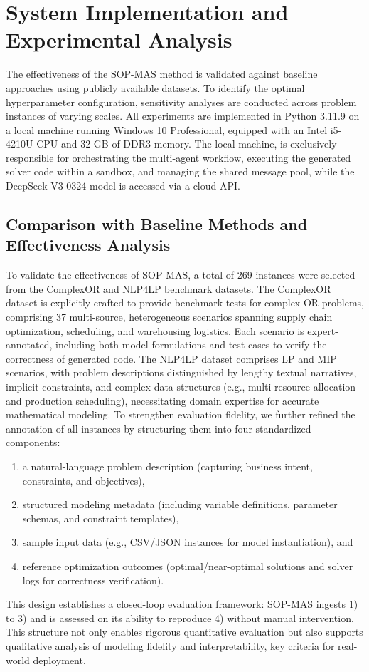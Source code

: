 \documentclass[preprint,12pt]{elsarticle}
\begin{document}
\section{System Implementation and Experimental Analysis}

The effectiveness of the SOP-MAS method is validated against baseline approaches using publicly available datasets. To identify the optimal hyperparameter configuration, sensitivity analyses are conducted across problem instances of varying scales. All experiments are implemented in Python 3.11.9 on a local machine running Windows 10 Professional, equipped with an Intel i5-4210U CPU and 32 GB of DDR3 memory. The local machine, is exclusively responsible for orchestrating the multi-agent workflow, executing the generated solver code within a sandbox, and managing the shared message pool, while the DeepSeek-V3-0324 model is accessed via a cloud API.

\subsection{Comparison with Baseline Methods and Effectiveness Analysis}

To validate the effectiveness of SOP-MAS, a total of 269 instances were selected from the ComplexOR and NLP4LP benchmark datasets. The ComplexOR dataset \citet{xiaoChainofExpertsWhenLLMs2023} is explicitly crafted to provide benchmark tests for complex OR problems, comprising 37 multi-source, heterogeneous scenarios spanning supply chain optimization, scheduling, and warehousing logistics. Each scenario is expert-annotated, including both model formulations and test cases to verify the correctness of generated code. The NLP4LP dataset comprises LP and MIP scenarios, with problem descriptions distinguished by lengthy textual narratives, implicit constraints, and complex data structures (e.g., multi-resource allocation and production scheduling), necessitating domain expertise for accurate mathematical modeling. To strengthen evaluation fidelity, we further refined the annotation of all instances by structuring them into four standardized components:
\begin{enumerate}[label=\arabic*)]
 \item a natural-language problem description (capturing business intent, constraints, and objectives),
 \item structured modeling metadata (including variable definitions, parameter schemas, and constraint templates),
 \item sample input data (e.g., CSV/JSON instances for model instantiation), and
 \item reference optimization outcomes (optimal/near-optimal solutions and solver logs for correctness verification).
\end{enumerate}
This design establishes a closed-loop evaluation framework: SOP-MAS ingests 1) to 3) and is assessed on its ability to reproduce 4) without manual intervention. This structure not only enables rigorous quantitative evaluation but also supports qualitative analysis of modeling fidelity and interpretability, key criteria for real-world deployment.
\end{document}
